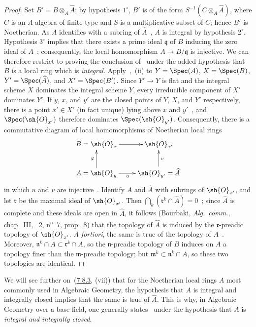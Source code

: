 \begin{proof}
Set $B'=B\otimes_A\widehat{A}$; by hypothesis $1^\circ$, $B'$ is of the form $S^{-1}(C\otimes_A\widehat{A})$, where $C$ is an $A$-algebra of finite type and $S$ is a multiplicative subset of $C$; hence $B'$ is Noetherian.
As $A$ identifies with a subring of $\widehat{A}$~, $A$ is integral by hypothesis $2^\circ$.
Hypothesis $3^\circ$ implies that there exists a prime ideal $\mathfrak{q}$ of $B$ inducing the zero ideal of $A$~; consequently, the local homomorphism $A\to B/\mathfrak{q}$ is injective.
We can therefore restrict to proving the conclusion of~ under the added hypothesis that $B$ is a local ring which is \emph{integral}.
Apply~,~(ii) to $Y=\Spec(A)$, $X=\Spec(B)$, $Y'=\Spec(\widehat{A})$, and $X'=\Spec(B')$.
Since $Y'\to Y$ is flat and the integral scheme $X$ dominates the integral scheme $Y$, every irreducible component of $X'$ dominates $Y'$.
If $y$, $x$, and $y'$ are the closed points of $Y$, $X$, and $Y'$ respectively, there is a point $x'\in X'$ (in fact unique) lying above $x$ and $y'$~, and $\Spec(\sh{O}_{x'})$ therefore dominates $\Spec(\sh{O}_{y'})$.
Consequently, there is a commutative diagram of local homomorphisms of Noetherian local rings
\[
\xymatrix{
  B=\sh{O}_x \ar[r] & \sh{O}_{x'}\\
  A=\sh{O}_y \ar[u]^{\varphi} \ar[r]_{u} & \sh{O}_{y'}=\widehat{A} \ar[u]_{v}
}
\]
in which $u$ and $v$ are injective~.
Identify $A$ and $\widehat{A}$ with subrings of $\sh{O}_{x'}$, and let $\mathfrak{r}$ be the maximal ideal of $\sh{O}_{x'}$.
Then $\bigcap_k(\mathfrak{r}^k\cap\widehat{A})=0$~; since $\widehat{A}$ is complete and these ideals are open in $\widehat{A}$, it follows (Bourbaki, \emph{Alg.~comm.}, chap.~III, \textsection~2, n\textsuperscript{o}~7, prop.~8) that the topology of $\widehat{A}$ is induced by the $\mathfrak{r}$-preadic topology of $\sh{O}_{x'}$.
\emph{A fortiori}, the same is true of the topology of $A$~.
Moreover, $\mathfrak{n}^k\cap A\subset\mathfrak{r}^k\cap A$, so the $\mathfrak{n}$-preadic topology of $B$ induces on $A$ a topology finer than the $\mathfrak{m}$-preadic topology; but $\mathfrak{m}^k\subset\mathfrak{n}^k\cap A$, so these two topologies are identical.
\end{proof}

\begin{remark}[2.3.9]
\label{IV.2.3.9}
We will see further on~({\hyperlink{ega4.c04.statement.7-8-3}{7.8.3}}, (vii)) that for the Noetherian local rings $A$ most commonly used in Algebraic Geometry, the hypothesis that $A$ is integral and integrally closed implies that the same is true of $\widehat{A}$.
This is why, in Algebraic Geometry over a base field, one generally states~ under the hypothesis that $A$ is \emph{integral and integrally closed}.
\end{remark}

